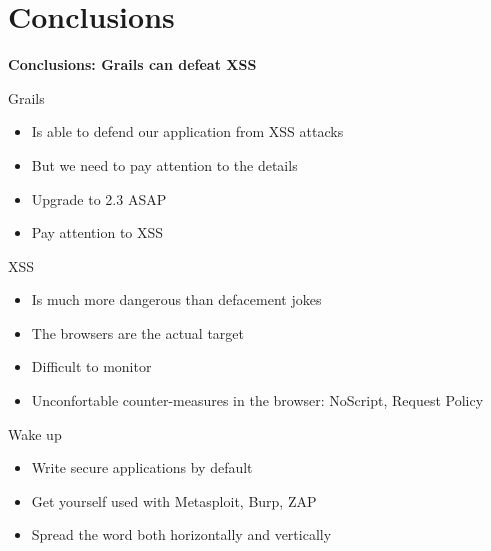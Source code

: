
\section{Conclusions}

\begin{frame}[plain]
    \begin{center}
      \Huge\bfseries
      Conclusions: Grails can defeat XSS
    \end{center}
\end{frame}

\begin{frame}{Grails}
  \begin{itemize}[<+-| alert@+>]
    \item Is able to defend our application from XSS attacks
    \item But we need to pay attention to the details
    \item Upgrade to 2.3 ASAP
    \item Pay attention to XSS
  \end{itemize}
\end{frame}

\begin{frame}{XSS}
  \begin{itemize}[<+-| alert@+>]
    \item Is much more dangerous than defacement jokes
    \item The browsers are the actual target 
    \item Difficult to monitor
    \item Unconfortable counter-measures in the browser: NoScript, Request Policy
  \end{itemize}
\end{frame}

\begin{frame}{Wake up}
 \begin{itemize}[<+-| alert@+>]
   \item Write secure applications by default
   \item Get yourself used with Metasploit, Burp, ZAP
   \item Spread the word both horizontally and vertically
 \end{itemize}
\end{frame}
